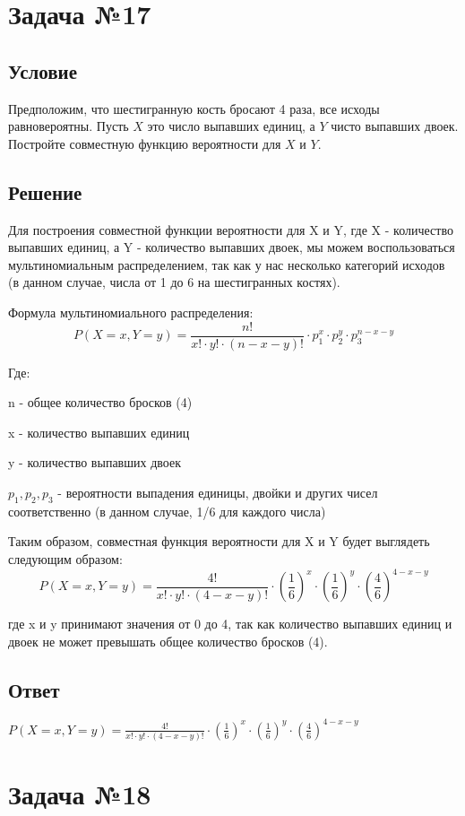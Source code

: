 \documentclass{article}
\begin{document}
\section*{Задача №17}
\subsection*{Условие}
Предположим, что шестигранную кость бросают 4 раза, все исходы
равновероятны. Пусть \(X\) это число выпавших единиц, а \(Y\) чисто выпавших двоек.
Постройте совместную функцию вероятности для \(X\) и \(Y\). 
\subsection*{Решение}
Для построения совместной функции вероятности для X и Y, где X - количество выпавших единиц, а Y - количество выпавших двоек, мы можем воспользоваться мультиномиальным распределением, так как у нас несколько категорий исходов (в данном случае, числа от 1 до 6 на шестигранных костях).

Формула мультиномиального распределения:
\[ P(X=x, Y=y) = \frac{n!}{x! \cdot y! \cdot (n-x-y)!} \cdot p_1^x \cdot p_2^y \cdot p_3^{n-x-y} \]

Где:


 n - общее количество бросков (4)


 x - количество выпавших единиц


 y - количество выпавших двоек


 $p_1, p_2, p_3$ - вероятности выпадения единицы, двойки и других чисел соответственно (в данном случае, 1/6 для каждого числа)

Таким образом, совместная функция вероятности для X и Y будет выглядеть следующим образом:
\[ P(X=x, Y=y) = \frac{4!}{x! \cdot y! \cdot (4-x-y)!} \cdot \left(\frac{1}{6}\right)^x \cdot \left(\frac{1}{6}\right)^y \cdot \left(\frac{4}{6}\right)^{4-x-y} \]

где x и y принимают значения от 0 до 4, так как количество выпавших единиц и двоек не может превышать общее количество бросков (4).
\subsection*{Ответ}
$P(X=x, Y=y) = \frac{4!}{x! \cdot y! \cdot (4-x-y)!} \cdot \left(\frac{1}{6}\right)^x \cdot \left(\frac{1}{6}\right)^y \cdot \left(\frac{4}{6}\right)^{4-x-y}$

\section*{Задача №18}
\end{document}
